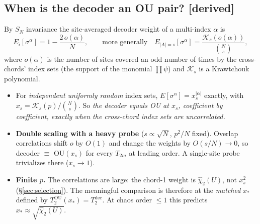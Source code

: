 \documentclass[11pt]{article}
\newcommand{\OU}{\mathrm{OU}}
\newcommand{\dec}{\mathrm{dec}}
\newcommand{\tagbox}[2]{\textsf{\small\color{#1}[#2]}}
\newcommand{\DER}{\tagbox{cder}{derived}}
\theoremstyle{remark}
\begin{document}
\subsection{When is the decoder an OU pair? \DER}
By $S_N$ invariance the site-averaged decoder weight of a multi-index $\alpha$ is
\begin{equation}
E_i[\sigma^\alpha]=1-\frac{2\,o(\alpha)}{N},\qquad\text{more generally}\quad E_{|A|=s}[\sigma^\alpha]=\frac{\mathcal K_s(o(\alpha))}{\binom Ns},
\end{equation}
where $o(\alpha)$ is the number of sites covered an odd number of times by the cross-chords' index sets (the support of
the monomial $\prod\psi$) and $\mathcal K_s$ is a Krawtchouk polynomial.
\begin{itemize}\itemsep1pt
\item For \emph{independent uniformly random} index sets, $E[\sigma^\alpha]=x_s^{|\alpha|}$ exactly, with
  $x_s=\mathcal K_s(p)/\binom Ns$. So \emph{the decoder equals OU at $x_s$, coefficient by coefficient, exactly when the
  cross-chord index sets are uncorrelated.}
\item \textbf{Double scaling with a heavy probe} ($s\propto\sqrt N$, $p^2/N$ fixed). Overlap correlations shift $o$ by
  $O(1)$ and change the weights by $O(s/N)\to0$, so decoder $\equiv$ OU$(x_s)$ for every $T_{2m}$ at leading order. A
  single-site probe trivializes there ($x_s\to1$).
\item \textbf{Finite $p$.} The correlations are large: the chord-1 weight is $\hat\chi_2(U)$, not $x_s^2$
  (\S\ref{sec:selection}). The meaningful comparison is therefore at the \emph{matched} $x_*$ defined by
  $T_2^\OU(x_*)=T_2^\dec$. At chaos order $\le1$ this predicts $x_*\approx\sqrt{\hat\chi_2(U)}$.
\end{itemize}
\end{document}
